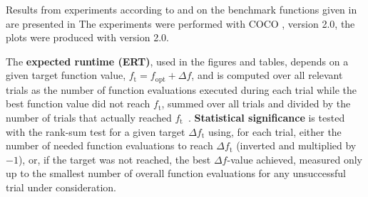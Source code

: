 \documentclass[sigconf]{acmart}
\newcommand{\Df}{\ensuremath{\Delta f}}
\newcommand{\fopt}{\ensuremath{f_\mathrm{opt}}}
\newcommand{\ftarget}{\ensuremath{f_\mathrm{t}}}
\newcommand{\change}[1]{{\color{red} #1}}
\begin{document}
Results from experiments according to \cite{hansen2016exp} and \cite{hansen2016perfass} on the
benchmark functions given in \cite{elhara:hal-02068407} are
presented in
The experiments were performed with COCO \cite{hansen2016cocoplat}, version
\change{2.0}, the plots were produced with version \change{2.0}.

The \textbf{expected runtime (ERT)}, used in the figures and tables,
depends on a given target function value, $\ftarget=\fopt+\Df$, and is
computed over all relevant trials as the number of function
evaluations executed during each trial while the best function value
did not reach \ftarget, summed over all trials and divided by the
number of trials that actually reached \ftarget\
\cite{hansen2012exp,price1997dev}. 
\textbf{Statistical significance} is tested with the rank-sum test for a given
target $\Delta\ftarget$ using, for each trial,
either the number of needed function evaluations to reach
$\Delta\ftarget$ (inverted and multiplied by $-1$), or, if the target
was not reached, the best $\Df$-value achieved, measured only up to
the smallest number of overall function evaluations for any
unsuccessful trial under consideration.
\end{document}
